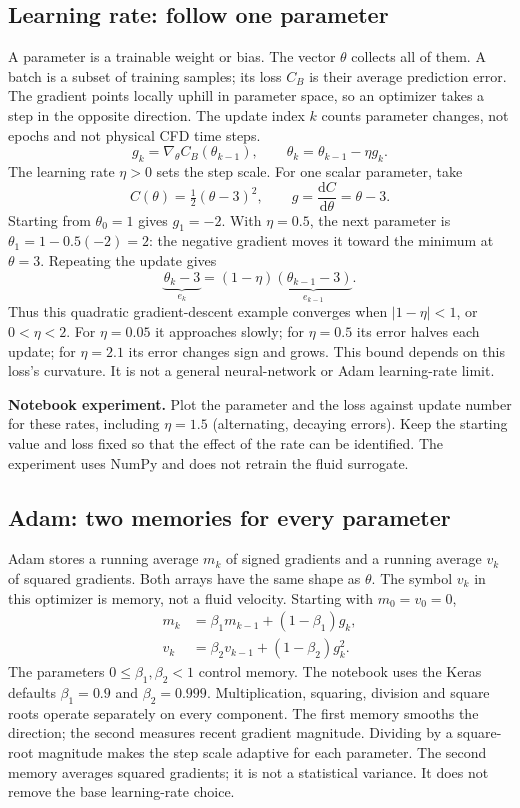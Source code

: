 \clearpage
\subsection{Learning rate: follow one parameter}
A parameter is a trainable weight or bias. The vector $\theta$ collects all of
them. A batch is a subset of training samples; its loss $C_B$ is their average
prediction error. The gradient points locally uphill in parameter space, so an
optimizer takes a step in the opposite direction. The update index $k$ counts
parameter changes, not epochs and not physical CFD time steps.
\[
g_k=\nabla_\theta C_B(\theta_{k-1}),\qquad
\theta_k=\theta_{k-1}-\eta g_k.
\]
The learning rate $\eta>0$ sets the step scale. For one scalar parameter, take
\[
C(\theta)=\tfrac12(\theta-3)^2,\qquad
g=\frac{\mathrm dC}{\mathrm d\theta}=\theta-3.
\]
Starting from $\theta_0=1$ gives $g_1=-2$. With $\eta=0.5$, the next parameter
is $\theta_1=1-0.5(-2)=2$: the negative gradient moves it toward the minimum
at $\theta=3$. Repeating the update gives
\[
\underbrace{\theta_k-3}_{e_k}
=(1-\eta)\underbrace{(\theta_{k-1}-3)}_{e_{k-1}}.
\]
Thus this quadratic gradient-descent example converges when $|1-\eta|<1$,
or $0<\eta<2$. For $\eta=0.05$ it approaches slowly; for $\eta=0.5$ its error
halves each update; for $\eta=2.1$ its error changes sign and grows.
This bound depends on this loss's curvature. It is not a general neural-network
or Adam learning-rate limit.

\textbf{Notebook experiment.} Plot the parameter and the loss against update
number for these rates, including $\eta=1.5$ (alternating, decaying errors). Keep the starting value and loss fixed so that
the effect of the rate can be identified. The experiment uses NumPy and does
not retrain the fluid surrogate.

\subsection{Adam: two memories for every parameter}
Adam stores a running average $m_k$ of signed gradients and a running average
$v_k$ of squared gradients. Both arrays have the same shape as $\theta$.
The symbol $v_k$ in this optimizer is memory, not a fluid velocity.
Starting with $m_0=v_0=0$,
\begin{align*}
m_k&=\beta_1m_{k-1}+(1-\beta_1)g_k,\\
v_k&=\beta_2v_{k-1}+(1-\beta_2)g_k^2.
\end{align*}
The parameters $0\leq\beta_1,\beta_2<1$ control memory. The notebook uses
the Keras defaults $\beta_1=0.9$ and $\beta_2=0.999$. Multiplication, squaring,
division and square roots operate separately on every component.
The first memory smooths the direction; the second measures recent gradient
magnitude. Dividing by a square-root magnitude makes the step scale adaptive
for each parameter. The second memory averages squared gradients; it is not a statistical variance. It does not remove the base learning-rate choice.

